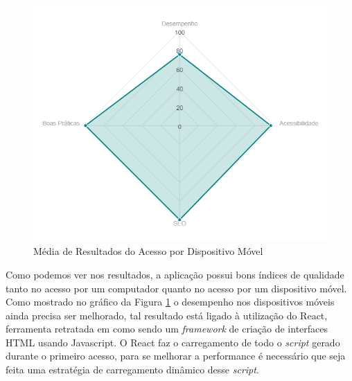\begin{figure}[H]
    \centering
    \includegraphics[width=12cm]{dados/figuras/Resultados/radar_mobile.png}
    \caption{Média de Resultados do Acesso por Dispositivo Móvel}
    \label{fig:graficoResultadosMobile}
\end{figure}

Como podemos ver nos resultados, a aplicação possui bons índices de qualidade tanto no acesso por um computador quanto no acesso por um dispositivo móvel. Como mostrado no gráfico da Figura \ref{fig:graficoResultadosMobile} o desempenho nos dispositivos móveis ainda precisa ser melhorado, tal resultado está ligado à utilização do React, ferramenta retratada em \cite{react} como sendo um \textit{framework} de criação de interfaces HTML usando Javascript. O React faz o carregamento de todo o \textit{script} gerado durante o primeiro acesso, para se melhorar a performance é necessário que seja feita uma estratégia de carregamento dinâmico desse \textit{script}.

